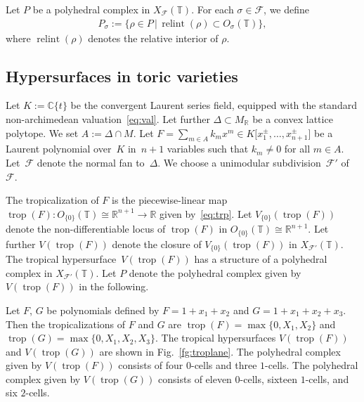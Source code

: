 \documentclass[pdftex]{sigma}
\numberwithin{equation}{section}
\begin{document}
Let $P$ be a polyhedral complex in $X_{{\mathcal F}}({\mathbb T})$. For each $\sigma \in {\mathcal F}$, we def\/ine
\begin{gather*}
P_\sigma:=\{ \rho \in P \,|\, \operatorname{relint}(\rho) \subset O_\sigma({\mathbb T}) \},
\end{gather*}
where $\operatorname{relint}(\rho)$ denotes the relative interior of $\rho$.

\subsection{Hypersurfaces in toric varieties}\label{sc:2.3}

Let $K := {\mathbb C}\{t\}$ be the convergent Laurent series f\/ield, equipped with the standard non-archi\-me\-dean valuation~\eqref{eq:val}. Let further $\Delta \subset M_{\mathbb R}$ be a convex lattice polytope. We set $A:=\Delta \cap M$. Let $F=\sum\limits_{m \in A} k_m x^m \in K \big[ x^\pm_{1},\dots,x^\pm_{n+1} \big] $ be a Laurent polynomial over~$K$ in~$n+1$ variables such that $k_m \neq 0$ for all $m \in A$. Let~${\mathcal F}$ denote the normal fan to~$\Delta$. We choose a unimodular subdivision~${\mathcal F}'$ of~${\mathcal F}$.

The tropicalization of $F$ is the piecewise-linear map $\operatorname{trop}(F) \colon O_{\{0\}}({\mathbb T}) \cong {\mathbb R}^{n+1} \to {\mathbb R}$ given by~\eqref{eq:trp}. Let $V_{\{0\}}(\operatorname{trop}(F))$ denote the non-dif\/ferentiable locus of $\operatorname{trop}(F)$ in $O_{\{0\}}({\mathbb T}) \cong {\mathbb R}^{n+1}$. Let further $V(\operatorname{trop}(F))$ denote the closure of $V_{\{0\}}(\operatorname{trop}(F))$ in $X_{{\mathcal F}'}({\mathbb T})$. The tropical hypersur\-face~$V(\operatorname{trop}(F))$ has a structure of a polyhedral complex in $X_{{\mathcal F}'}({\mathbb T})$. Let $P$ denote the polyhedral complex given by $V(\operatorname{trop}(F))$ in the following.

\begin{Example} Let $F$, $G$ be polynomials def\/ined by $F=1+x_1+x_2$ and $G=1+x_1+x_2+x_3$. Then the tropicalizations of $F$ and $G$ are $\operatorname{trop}(F)=\max \{ 0, X_1, X_2 \}$ and $\operatorname{trop}(G)=\max \{0, X_1, X_2, X_3\}$. The tropical hypersurfaces $V(\operatorname{trop}(F))$ and $V(\operatorname{trop}(G))$ are shown in Fig.~\ref{fg:troplane}. The polyhedral complex given by $V(\operatorname{trop}(F))$ consists of four $0$-cells and three $1$-cells. The polyhedral complex given by $V(\operatorname{trop}(G))$ consists of eleven $0$-cells, sixteen $1$-cells, and six $2$-cells.
\end{Example}
\end{document}
